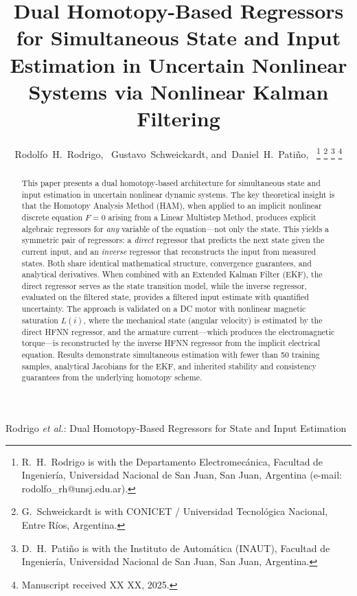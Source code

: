 \documentclass[lettersize,journal]{IEEEtran}
\begin{document}
\title{Dual Homotopy-Based Regressors for Simultaneous State and Input Estimation in Uncertain Nonlinear Systems via Nonlinear Kalman Filtering}

\author{Rodolfo~H.~Rodrigo,~
        Gustavo~Schweickardt,
        and~Daniel~H.~Pati\~no,~
\thanks{R.~H.~Rodrigo is with the Departamento Electromec\'anica, Facultad de Ingenier\'ia, Universidad Nacional de San Juan, San Juan, Argentina (e-mail: rodolfo\_rh@unsj.edu.ar).}
\thanks{G.~Schweickardt is with CONICET / Universidad Tecnol\'ogica Nacional, Entre R\'ios, Argentina.}
\thanks{D.~H.~Pati\~no is with the Instituto de Autom\'atica (INAUT), Facultad de Ingenier\'ia, Universidad Nacional de San Juan, San Juan, Argentina.}
\thanks{Manuscript received XX XX, 2025.}}

%
{Rodrigo \MakeLowercase{\textit{et al.}}: Dual Homotopy-Based Regressors for State and Input Estimation}

\maketitle

\begin{abstract}
This paper presents a dual homotopy-based architecture for simultaneous state and input estimation in uncertain nonlinear dynamic systems. The key theoretical insight is that the Homotopy Analysis Method (HAM), when applied to an implicit nonlinear discrete equation $F = 0$ arising from a Linear Multistep Method, produces explicit algebraic regressors for \emph{any} variable of the equation---not only the state. This yields a symmetric pair of regressors: a \emph{direct} regressor that predicts the next state given the current input, and an \emph{inverse} regressor that reconstructs the input from measured states. Both share identical mathematical structure, convergence guarantees, and analytical derivatives. When combined with an Extended Kalman Filter (EKF), the direct regressor serves as the state transition model, while the inverse regressor, evaluated on the filtered state, provides a filtered input estimate with quantified uncertainty. The approach is validated on a DC motor with nonlinear magnetic saturation $L(i)$, where the mechanical state (angular velocity) is estimated by the direct HFNN regressor, and the armature current---which produces the electromagnetic torque---is reconstructed by the inverse HFNN regressor from the implicit electrical equation. Results demonstrate simultaneous estimation with fewer than 50 training samples, analytical Jacobians for the EKF, and inherited stability and consistency guarantees from the underlying homotopy scheme.
\end{abstract}
\end{document}
